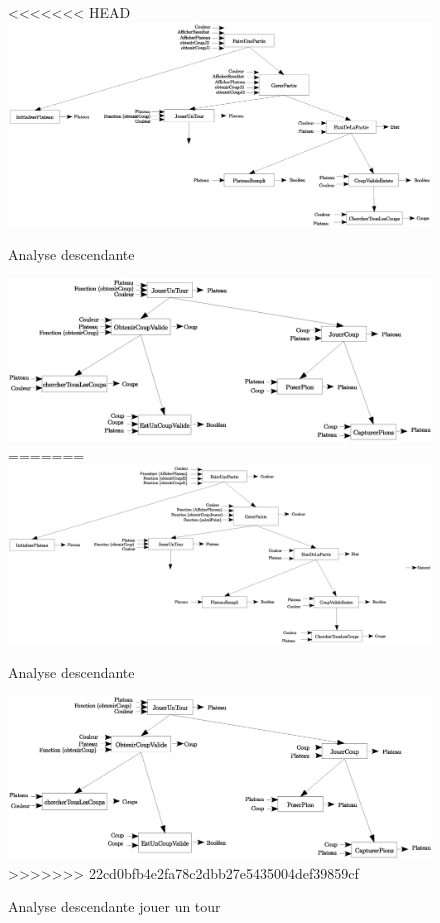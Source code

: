 \begin{figure}[ht]
  \centering
<<<<<<< HEAD
  \includegraphics[scale = 0.2]{rapport/sourcesIMAGES/analyse_descendante.eps}
  \caption{Analyse descendante}
  \includegraphics[scale = 0.2]{rapport/sourcesIMAGES/analyse_descendante_jouer_un_tour.eps}
=======
  \includegraphics[scale = 0.2]{rapport/sourcesIMAGES/Analyse_descendante.eps}
  \caption{Analyse descendante}
  \includegraphics[scale = 0.2]{rapport/sourcesIMAGES/Analyse_descendante_jouer_un_tour.eps}
>>>>>>> 22cd0bfb4e2fa78c2dbb27e5435004def39859cf
  \caption{Analyse descendante jouer un tour}
\end{figure}
